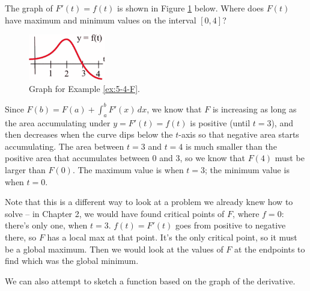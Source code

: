 \begin{example}
  \label{ex:5-4-F}
The graph of $F'(t)=f(t)$ is shown in Figure \ref{fig:5-4-F} below. Where does $F(t)$ have maximum and minimum values on the interval $[0, 4]$?

\begin{figure}[!ht]
  \centering
    \includegraphics[width=0.3\textwidth]{img/chap5/image037.png}
    \caption{Graph for Example \ref{ex:5-4-F}.}
    \label{fig:5-4-F}
\end{figure}

\begin{solution}
Since $F(b)=F(a)+\displaystyle\int_a^b F'(x)\,dx$, we know that $F$ is increasing as long as the area accumulating under $y = F'(t)=f(t)$ is positive (until $t=3$), and then decreases when the curve dips below the $t$-axis so that negative area starts accumulating. The area between $t=3$ and $t=4$ is much smaller than the positive area that accumulates between 0 and 3, so we know that $F(4)$ must be larger than $F(0)$. The maximum value is when $t=3$; the minimum value is when $t=0$.
\end{solution}\end{example}

Note that this is a different way to look at a problem we already knew how to solve – in Chapter 2, we would have found critical points of $F$, where $f=0$: there's only one, when $t=3$. $f(t)=F'(t)$ goes from positive to negative there, so $F$ has a local max at that point. It's the only critical point, so it must be a global maximum. Then we would look at the values of $F$ at the endpoints to find which was the global minimum.

We can also attempt to sketch a function based on the graph of the derivative.

